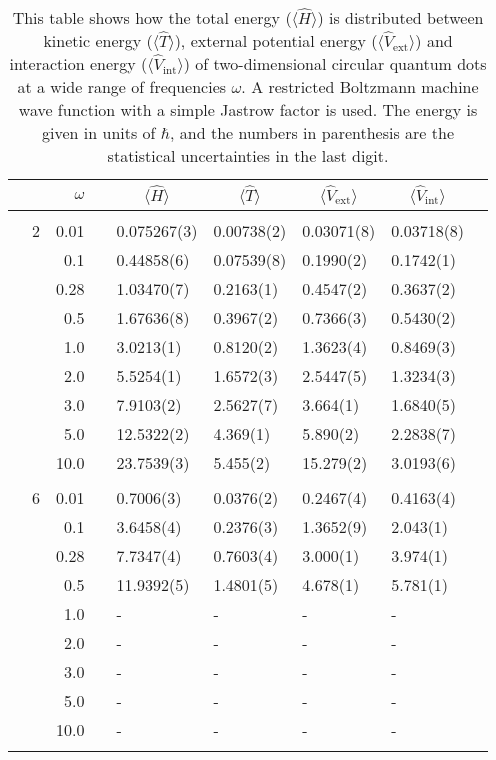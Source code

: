 \begin{table}[H]
	\caption{This table shows how the total energy ($\langle\hat{H}\rangle$) is distributed between kinetic energy ($\langle\hat{T}\rangle$), external potential energy ($\langle\hat{V}_{\text{ext}}\rangle$) and interaction energy ($\langle\hat{V}_{\text{int}}\rangle$) of two-dimensional circular quantum dots at a wide range of frequencies $\omega$. A restricted Boltzmann machine wave function with a simple Jastrow factor is used. The energy is given in units of $\hbar$, and the numbers in parenthesis are the statistical uncertainties in the last digit.}
	\label{tab:splitfrequencyQDRBMSJ}
	\begin{tabularx}{\textwidth}{R{1cm}rrcR{2.3cm}R{2.3cm}R{2.3cm}R{2.3cm}R{1cm}} \hline\hline
		&\makecell{\\ \phantom{$N$} \\ \phantom{=}} & $\omega$ &&  &  &  &  & \\ \hline \\
		&2 & 0.01 && 0.075267(3) & 0.00738(2) & 0.03071(8) & 0.03718(8) \\
		&& 0.1 && 0.44858(6) & 0.07539(8) & 0.1990(2) & 0.1742(1) \\
		&& 0.28 && 1.03470(7) & 0.2163(1) & 0.4547(2) & 0.3637(2) \\
		&& 0.5 && 1.67636(8) & 0.3967(2) & 0.7366(3) & 0.5430(2)\\
		&& 1.0 && 3.0213(1) & 0.8120(2) & 1.3623(4) & 0.8469(3)\\
		&& 2.0 && 5.5254(1) & 1.6572(3) & 2.5447(5) & 1.3234(3) \\
		&& 3.0 && 7.9103(2) & 2.5627(7) & 3.664(1) & 1.6840(5) \\ 
		&& 5.0 && 12.5322(2) & 4.369(1) & 5.890(2) & 2.2838(7) \\
		&& 10.0 && 23.7539(3) & 5.455(2) & 15.279(2) & 3.0193(6) \\
		\hdashline \\
		
		&6 & 0.01 && 0.7006(3) & 0.0376(2) & 0.2467(4) & 0.4163(4) \\
		&& 0.1 && 3.6458(4) & 0.2376(3) & 1.3652(9) & 2.043(1) \\
		&& 0.28 && 7.7347(4) & 0.7603(4) & 3.000(1) & 3.974(1) \\
		&& 0.5 && 11.9392(5) & 1.4801(5) & 4.678(1) & 5.781(1) \\
		&& 1.0 && - & - & - & - \\
		&& 2.0 && - & - & - & -\\
		&& 3.0 && - & - & - & - \\ 
		&& 5.0 && - & - & - & -\\
		&& 10.0 && - & - & - & -\\
		\hdashline \\
		

\end{tabularx}
\end{table}
